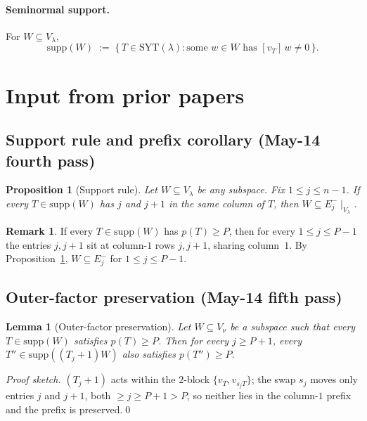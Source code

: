 \documentclass[11pt]{article}
\newtheorem{lemma}[theorem]{Lemma}
\newtheorem{proposition}[theorem]{Proposition}
\theoremstyle{definition}
\newtheorem{remark}[theorem]{Remark}
\newcommand{\supp}{\mathrm{supp}}
\newcommand{\SYT}{\mathrm{SYT}}
\begin{document}
\paragraph{Seminormal support.}  For $W \subseteq V_\lambda$,
\[
   \supp(W) \;:=\; \{\,T \in \SYT(\lambda) : \text{some } w \in W
   \text{ has } [v_T]\,w \ne 0\,\}.
\]

\section{Input from prior papers}\label{sec:input}

\subsection{Support rule and prefix corollary (May-14 fourth pass)}

\begin{proposition}[Support rule]\label{prop:support-rule}
Let $W \subseteq V_\lambda$ be any subspace.  Fix $1 \le j \le n-1$.
If every $T \in \supp(W)$ has $j$ and $j+1$ in the same column of $T$,
then $W \subseteq E_j^-\!\mid_{V_\lambda}$.
\end{proposition}

\begin{remark}\label{rem:prefix-implies-Ej-}
If every $T \in \supp(W)$ has $p(T) \ge P$, then for every
$1 \le j \le P - 1$ the entries $j, j+1$ sit at column-$1$ rows
$j, j+1$, sharing column~$1$.  By Proposition~\ref{prop:support-rule},
$W \subseteq E_j^-$ for $1 \le j \le P - 1$.
\end{remark}

\subsection{Outer-factor preservation (May-14 fifth pass)}

\begin{lemma}[Outer-factor preservation]\label{lem:outer-preserve}
Let $W \subseteq V_\nu$ be a subspace such that every $T \in \supp(W)$
satisfies $p(T) \ge P$.  Then for every $j \ge P + 1$,
every $T'' \in \supp((T_j{+}1) W)$ also satisfies $p(T'') \ge P$.
\end{lemma}

\begin{proof}[Proof sketch]
$(T_j+1)$ acts within the $2$-block $\{v_T, v_{s_j T}\}$; the swap $s_j$
moves only entries $j$ and $j+1$, both $\ge j \ge P + 1 > P$, so neither
lies in the column-$1$ prefix and the prefix is preserved.\qed
\end{proof}
\end{document}
